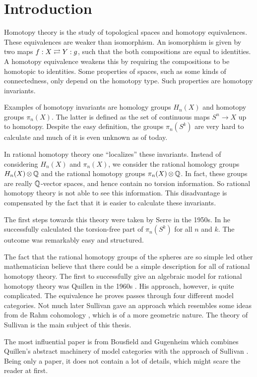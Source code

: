 
\chapter*{Introduction}

Homotopy theory is the study of topological spaces and homotopy equivalences. These equivalences are weaker than isomorphism. An isomorphism is given by two maps $f : X \rightleftarrows Y : g$, such that the both compositions are equal to identities. A homotopy equivalence weakens this by requiring the compositions to be homotopic to identities. Some properties of spaces, such as some kinds of connectedness, only depend on the homotopy type. Such properties are homotopy invariants.

Examples of homotopy invariants are homology groups $H_n(X)$ and homotopy groups $\pi_n(X)$. The latter is defined as the set of continuous maps $S^n \to X$ up to homotopy. Despite the easy definition, the groups $\pi_n(S^k)$ are very hard to calculate and much of it is even unknown as of today.

In rational homotopy theory one ``localizes'' these invariants. Instead of considering $H_n(X)$ and $\pi_n(X)$, we consider the rational homology groups $H_n(X) \operatorname*{\otimes} \mathbb{Q}$ and the rational homotopy groups $\pi_n(X) \operatorname*{\otimes} \mathbb{Q}$. In fact, these groups are really $\mathbb{Q}$-vector spaces, and hence contain no torsion information. So rational homotopy theory is not able to see this information. This disadvantage is compensated by the fact that it is easier to calculate these invariants.

The first steps towards this theory were taken by Serre in the 1950s. In \cite{serre} he successfully calculated the torsion-free part of $\pi_n(S^k)$ for all $n$ and $k$. The outcome was remarkably easy and structured.

The fact that the rational homotopy groups of the spheres are so simple led other mathematician believe that there could be a simple description for all of rational homotopy theory. The first to successfully give an algebraic model for rational homotopy theory was Quillen in the 1960s \cite{quillen}. His approach, however, is quite complicated. The equivalence he proves passes through four different model categories. Not much later Sullivan gave an approach which resembles some ideas from de Rahm cohomology \cite{sullivan}, which is of a more geometric nature. The theory of Sullivan is the main subject of this thesis.

The most influential paper is from Bousfield and Gugenheim which combines Quillen's abstract machinery of model categories with the approach of Sullivan \cite{bousfield}. Being only a paper, it does not contain a lot of details, which might scare the reader at first.

